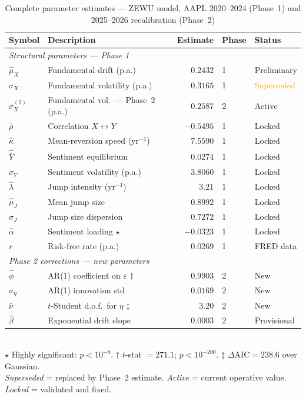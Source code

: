 \documentclass[12pt,a4paper]{article}
\theoremstyle{definition}
\theoremstyle{remark}
\begin{document}
\begin{table}[H]
  \centering
  \caption{Complete parameter estimates --- ZEWU model, AAPL 2020--2024
           (Phase~1) and 2025--2026 recalibration (Phase~2)}
  \label{tab:params}
  \begin{tabular}{llrll}
    \toprule
    Symbol & Description & Estimate & Phase & Status \\
    \midrule
    \multicolumn{5}{l}{\textit{Structural parameters --- Phase 1}} \\
    $\hat{\mu}_X$ & Fundamental drift (p.a.) & $0.2432$ & 1 & Preliminary \\
    $\hat{\sigma}_X$ & Fundamental volatility (p.a.) & $0.3165$ & 1 &
      \textcolor{orange}{Superseded} \\
    $\hat{\sigma}_X^{(2)}$ & Fundamental vol.\ --- Phase~2 (p.a.) & $0.2587$ & 2 &
      \textcolor{okgreen}{Active} \\
    $\hat{\rho}$ & Correlation $X \leftrightarrow Y$ & $-0.5495$ & 1 & Locked \\
    $\hat{\kappa}$ & Mean-reversion speed (yr$^{-1}$) & $7.5590$ & 1 & Locked \\
    $\hat{\bar{Y}}$ & Sentiment equilibrium & $0.0274$ & 1 & Locked \\
    $\hat{\sigma}_Y$ & Sentiment volatility (p.a.) & $3.8060$ & 1 & Locked \\
    $\hat{\lambda}$ & Jump intensity (yr$^{-1}$) & $3.21$ & 1 & Locked \\
    $\hat{\mu}_J$ & Mean jump size & $0.8992$ & 1 & Locked \\
    $\hat{\sigma}_J$ & Jump size dispersion & $0.7272$ & 1 & Locked \\
    $\hat{\alpha}$ & Sentiment loading $\star$ & $-0.0323$ & 1 & Locked \\
    $r$ & Risk-free rate (p.a.) & $0.0269$ & 1 & FRED data \\
    \midrule
    \multicolumn{5}{l}{\textit{Phase 2 corrections --- new parameters}} \\
    $\hat{\phi}$ & AR(1) coefficient on $\varepsilon$ $\dagger$ & $0.9903$ & 2 &
      \textcolor{okgreen}{New} \\
    $\hat{\sigma}_\eta$ & AR(1) innovation std & $0.0169$ & 2 &
      \textcolor{okgreen}{New} \\
    $\hat{\nu}$ & $t$-Student d.o.f.\ for $\eta$ $\ddagger$ & $3.20$ & 2 &
      \textcolor{okgreen}{New} \\
    $\hat{\beta}$ & Exponential drift slope & $0.0003$ & 2 &
      Provisional \\
    \bottomrule
  \end{tabular}
  \smallskip\\
  \small
  $\star$ Highly significant: $p < 10^{-8}$.
  $\dagger$ $t$-stat $= 271.1$; $p < 10^{-200}$.
  $\ddagger$ $\Delta\mathrm{AIC} = 238.6$ over Gaussian.\\
  \textit{Superseded} = replaced by Phase~2 estimate.
  \textit{Active} = current operative value.
  \textit{Locked} = validated and fixed.
\end{table}
\end{document}
